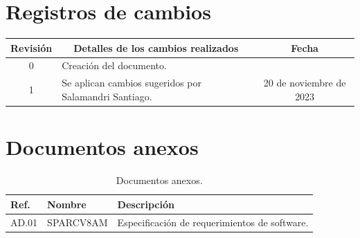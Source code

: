 \documentclass[
  11pt, %
  codirector, %
]{charter}
\begin{document}
\maketitle
\tableofcontents

\newpage

\section*{Registros de cambios}
\label{sec:registro}


\begin{table}[ht]
	\label{tab:registro}
	\centering
	\begin{tabularx}{\linewidth}{@{}|c|X|c|@{}}
		\hline
		\rowcolor[HTML]{C0C0C0}
		Revisión & \multicolumn{1}{c|}{\cellcolor[HTML]{C0C0C0}Detalles de los cambios realizados} & Fecha      \\ \hline
		0      & Creación del documento.                                 &\fechaInicioName \\ \hline

    		1      & Se aplican cambios sugeridos por Salamandri Santiago. & 20 de noviembre de 2023 \\ \hline


    \hline

	\end{tabularx}
	\label{sec:cierre}
\end{table}



\section*{Documentos anexos}
\label{sec:documentos_anexos}

\begin{table}[h!]
	\centering
	\begin{tabular}{ | m{1.5cm} | m{3cm} | m{10.5cm} | }
		\hline
		\rowcolor{gray!50} %
		\textbf{Ref.} & \textbf{Nombre} & \textbf{Descripción} \\ \hline
    AD.01 & SPARC\-V8\-AM & Especificación de requerimientos de software. \\ \hline
	\end{tabular}
  \caption{Documentos anexos.}
  \label{tab:referencias}

\end{table}
\end{document}

